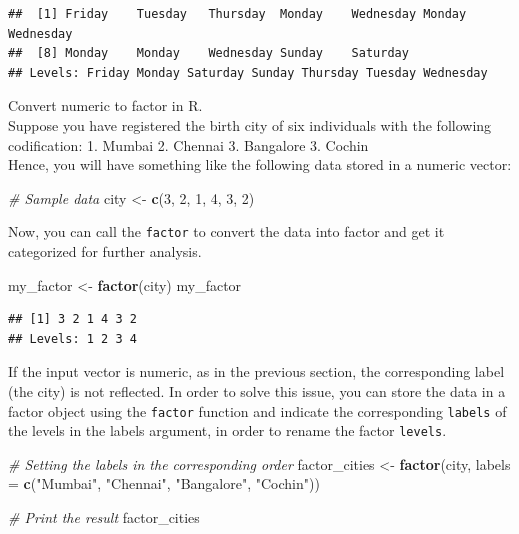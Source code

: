 \documentclass[
]{book}
\newenvironment{Shaded}{\begin{snugshade}}{\end{snugshade}}
\newcommand{\AttributeTok}[1]{\textcolor[rgb]{0.13,0.29,0.53}{#1}}
\newcommand{\CommentTok}[1]{\textcolor[rgb]{0.56,0.35,0.01}{\textit{#1}}}
\newcommand{\DecValTok}[1]{\textcolor[rgb]{0.00,0.00,0.81}{#1}}
\newcommand{\FunctionTok}[1]{\textcolor[rgb]{0.13,0.29,0.53}{\textbf{#1}}}
\newcommand{\NormalTok}[1]{#1}
\newcommand{\OtherTok}[1]{\textcolor[rgb]{0.56,0.35,0.01}{#1}}
\newcommand{\StringTok}[1]{\textcolor[rgb]{0.31,0.60,0.02}{#1}}
\begin{document}
\begin{verbatim}
##  [1] Friday    Tuesday   Thursday  Monday    Wednesday Monday    Wednesday
##  [8] Monday    Monday    Wednesday Sunday    Saturday 
## Levels: Friday Monday Saturday Sunday Thursday Tuesday Wednesday
\end{verbatim}

Convert numeric to factor in R.\\
Suppose you have registered the birth city of six individuals with the following codification:
1. Mumbai
2. Chennai
3. Bangalore
3. Cochin\\
Hence, you will have something like the following data stored in a numeric vector:

\begin{Shaded}
\begin{Highlighting}[]
\CommentTok{\# Sample data}
\NormalTok{city }\OtherTok{\textless{}{-}} \FunctionTok{c}\NormalTok{(}\DecValTok{3}\NormalTok{, }\DecValTok{2}\NormalTok{, }\DecValTok{1}\NormalTok{, }\DecValTok{4}\NormalTok{, }\DecValTok{3}\NormalTok{, }\DecValTok{2}\NormalTok{)}
\end{Highlighting}
\end{Shaded}

Now, you can call the \texttt{factor} to convert the data into factor and get it categorized for further analysis.

\begin{Shaded}
\begin{Highlighting}[]
\NormalTok{my\_factor }\OtherTok{\textless{}{-}} \FunctionTok{factor}\NormalTok{(city)}
\NormalTok{my\_factor}
\end{Highlighting}
\end{Shaded}

\begin{verbatim}
## [1] 3 2 1 4 3 2
## Levels: 1 2 3 4
\end{verbatim}

If the input vector is numeric, as in the previous section, the corresponding label (the city) is not reflected. In order to solve this issue, you can store the data in a factor object using the \texttt{factor} function and indicate the corresponding \texttt{labels} of the levels in the labels argument, in order to rename the factor \texttt{levels}.

\begin{Shaded}
\begin{Highlighting}[]
\CommentTok{\# Setting the labels in the corresponding order}
\NormalTok{factor\_cities }\OtherTok{\textless{}{-}} \FunctionTok{factor}\NormalTok{(city, }\AttributeTok{labels =} \FunctionTok{c}\NormalTok{(}\StringTok{"Mumbai"}\NormalTok{, }\StringTok{"Chennai"}\NormalTok{, }\StringTok{"Bangalore"}\NormalTok{, }\StringTok{"Cochin"}\NormalTok{))}

\CommentTok{\# Print the result}
\NormalTok{factor\_cities}
\end{Highlighting}
\end{Shaded}
\end{document}
